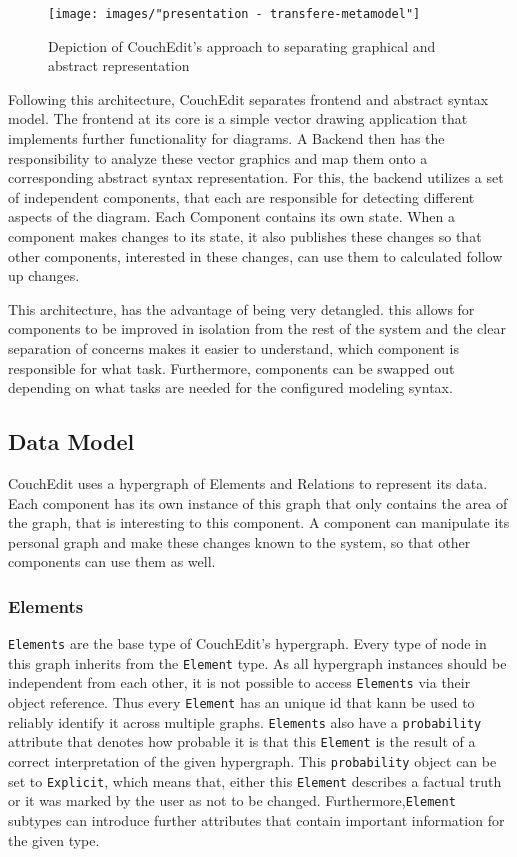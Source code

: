 \begin{figure}
  \centering
  \texttt{[image: images/"presentation - transfere-metamodel"]}
  \caption{Depiction of CouchEdit's approach to separating graphical and abstract representation}
  \label{fig:transmm}
  \end{figure}

Following this architecture, CouchEdit separates frontend and abstract syntax model. The frontend at its core is a simple vector drawing application that implements further functionality for diagrams. A Backend then has the responsibility to analyze these vector graphics and map them onto a corresponding abstract syntax representation. For this, the backend utilizes a set of independent components, that each are responsible for detecting different aspects of the diagram. Each Component contains its own state. When a component makes changes to its state, it also publishes these changes so that other components, interested in these changes, can use them to calculated follow up changes.  

This architecture, has the advantage of being very detangled. this allows for components to be improved in isolation from the rest of the system and the clear separation of concerns makes it easier to understand, which component is responsible for what task. Furthermore, components can be swapped out depending on what tasks are needed for the configured modeling syntax.



\subsection{Data Model}
CouchEdit uses a hypergraph of Elements and Relations to represent its data. Each component has its own instance of this graph that only contains the area of the graph, that is interesting to this component. A component can manipulate its personal graph and make these changes known to the system, so that other components can use them as well.


\subsubsection{Elements}
\texttt{Elements} are the base type of CouchEdit's hypergraph. Every type of node in this graph inherits from the \texttt{Element} type. As all hypergraph instances should be independent from each other, it is not possible to access \texttt{Elements} via their object reference. Thus every \texttt{Element} has an unique id that kann be used to reliably identify it across multiple graphs. \texttt{Elements} also have a \texttt{probability} attribute that denotes how probable it is that this \texttt{Element} is the result of a correct interpretation of the given hypergraph. This \texttt{probability} object can be set to \texttt{Explicit}, which means that, either this \texttt{Element} describes a factual truth or it was marked by the user as not to be changed. Furthermore,\texttt{Element} subtypes can introduce further attributes that contain important information for the given type.

